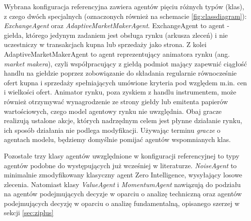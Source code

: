 Wybrana konfiguracja referencyjna zawiera agentów pięciu różnych typów (klas), z czego dwóch specjalnych (oznaczonych również na schemacie \ref{fig:classdiagram}): \textit{ExchangeAgent} oraz \textit{AdaptiveMarketMakerAgent}. ExchangeAgent to agent - giełda, którego jedynym zadaniem jest obsługa rynku (arkusza zleceń) i nie uczestniczy w transakcjach kupna lub sprzedaży jako strona. Z kolei AdaptiveMarketMakerAgent to agent reprezentujący animatora rynku (ang. \textit{market makera}), czyli współpracujący z giełdą podmiot mający zapewnić ciągłość handlu na giełdzie poprzez zobowiązanie do składania regularnie równocześnie ofert kupna i sprzedaży spełniających umówione kryteria pod względem m.in. cen i wielkości ofert. Animator rynku, poza zyskiem z handlu instrumentem, może również otrzymywać wynagrodzenie ze strony giełdy lub emitenta papierów wartościowych, czego model agentowy rynku nie uwzględnia. Obaj gracze realizują ustalone akcje, których nadrzędnym celem jest płynne działanie rynku, ich sposób działania nie podlega modyfikacji. Używając terminu \textit{gracze} o agentach modelu, będziemy domyślnie pomijać agentów wspomnianych klas.

Pozostałe trzy klasy agentów uwzględnione w konfiguracji referencyjnej to typy agentów podobne do występujących już wcześniej w literaturze. \textit{NoiseAgent} to minimalnie zmodyfikowany klasyczny agent Zero Intelligence, wysyłający losowe zlecenia. Natomiast klasy \textit{ValueAgent} i \textit{MomentumAgent} nawiązują do podziału na agentów podejmujących decyzje w oparciu o analizę techniczną oraz agentów podejmujących decyzję w oparciu o analizę fundamentalną, opisanego szerzej w sekcji \ref{sec:ziplus}
